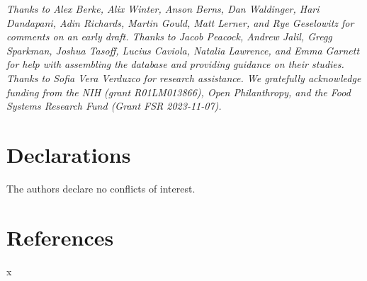 \documentclass[preprint, 3p,
authoryear]{elsarticle} %
\begin{document}
\emph{Thanks to Alex Berke, Alix Winter, Anson Berns, Dan Waldinger,
Hari Dandapani, Adin Richards, Martin Gould, Matt Lerner, and Rye
Geselowitz for comments on an early draft. Thanks to Jacob Peacock,
Andrew Jalil, Gregg Sparkman, Joshua Tasoff, Lucius Caviola, Natalia
Lawrence, and Emma Garnett for help with assembling the database and
providing guidance on their studies. Thanks to Sofia Vera Verduzco for
research assistance. We gratefully acknowledge funding from the NIH
(grant R01LM013866), Open Philanthropy, and the Food Systems Research
Fund (Grant FSR 2023-11-07).}

\section*{Declarations}\label{declarations}

The authors declare no conflicts of interest. \newpage

\section*{References}\label{references}

x


\end{document}
